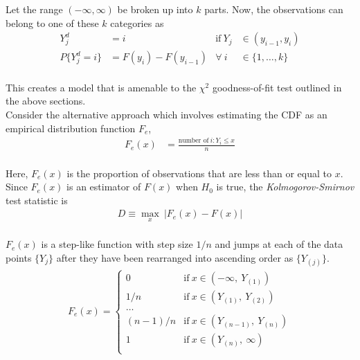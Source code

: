 Let the range $ (-\infty, \infty) $ be broken up into $ k $ parts. Now, the observations can belong to one of these $ k $ categories as\\

\begin{align}
	Y^d_j &= i & \text{if}\ Y_j &\in (y_{i-1}, y_i) \\
	P\{Y_j^d = i\} &= F(y_i) - F(y_{i-1}) & \forall \ i &\in \{1,\dots,k\}
\end{align}\\

This creates a model that is amenable to the $ \chi^2 $ goodness-of-fit test outlined in the above sections.\\

Consider the alternative approach which involves estimating the CDF as an empirical distribution function $ F_e $,\\

\begin{align}
	F_e(x) &= \frac{\text{number of}\ i : Y_i \leq x}{n}
\end{align}\\

Here, $ F_e (x) $ is the proportion of observations that are less than or equal to $ x $. Since $ F_e (x) $ is an estimator of $ F(x) $ when $ H_0 $ is true, the \textit{Kolmogorov-Smirnov} test statistic is \\

\begin{align}
	D \equiv \max_{x}\  \Big|F_e (x) - F(x)\Big|
\end{align}\\

$ F_e (x) $ is a step-like function with step size $ 1/n $ and jumps at each of the data points $ \{Y_j\} $ after they have been rearranged into ascending order as $ \{Y_{(j)}\} $.\\

\begin{align}
	F_e (x) = 
	\begin{cases}
		0 & \text{if}\ x \in (-\infty,\ Y_{(1)}) \\
		1/n & \text{if}\ x \in (Y_{(1)},\ Y_{(2)}) \\
		\dots \\
		(n-1) / n & \text{if}\ x \in (Y_{(n-1)},\ Y_{(n)}) \\
		1 & \text{if}\ x \in (Y_{(n)},\ \infty) \\
	\end{cases}
\end{align}\\

